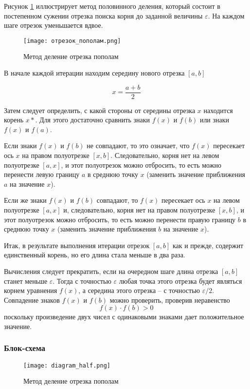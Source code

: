\documentclass[a4paper,12pt]{article}
\begin{document}
Рисунок \ref{fig:method_half} иллюстрирует метод половинного деления, который состоит в постепенном сужении
отрезка поиска корня до заданной величины $\varepsilon$. На каждом шаге отрезок уменьшается вдвое. 

\begin{figure}[h]
\centering
\texttt{[image: отрезок\_пополам.png]}
\caption{Метод деление отрезка пополам}
\label{fig:method_half}
\end{figure}

В начале каждой итерации находим середину нового отрезка $[a , b]$

$$x = \frac{a+b}{2}$$

Затем следует определить, с какой стороны от середины отрезка $x$ находится корень $x*$. Для этого достаточно сравнить знаки $f (x)$ и $f (b)$ или знаки $f (x)$ и $f (a)$.

Если знаки $f (x)$ и $f (b)$ не совпадают, то это означает, что $f (x)$ пересекает ось $x$ на правом полуотрезке $[x, b]$. Следовательно, корня нет на левом полуотрезке $[a, x]$, и этот полуотрезок можно отбросить, то есть можно перенести левую границу $a$ в среднюю точку $x$ (заменить значение приближения $a$ на значение $x$).

Если же знаки $f (x)$ и $f (b)$ совпадают, то $f (x)$ пересекает ось $x$ на левом полуотрезке $[a, x]$ и, следовательно, корня нет на правом полуотрезке $[x ,b]$, и этот полуотрезок можно отбросить, то есть можно перенести правую границу $b$ в среднюю точку $x$ (заменить значение приближения $b$ на значение $x$).

Итак, в результате выполнения итерации отрезок $[a, b]$ как и прежде, содержит единственный корень, но его длина стала меньше в два раза.

Вычисления следует прекратить, если на очередном шаге длина отрезка $[a, b]$ станет меньше
$\varepsilon$. Тогда с точностью $\varepsilon$ любая точка этого отрезка будет являться корнем уравнения $f(x)$, а середина
этого отрезка – с точностью $\varepsilon/2$.
Совпадение знаков $f (x)$ и $f (b)$ можно проверить, проверив неравенство
$$f(x) \cdot f(b) > 0$$
поскольку произведение двух чисел с одинаковыми знаками дает положительное значение.

\subsubsection{Блок-схема}

\begin{figure}[h]
\centering
\texttt{[image: diagram\_half.png]}
\caption{Метод деление отрезка пополам}
\label{fig:method_half_diagram}
\end{figure}
\end{document}
